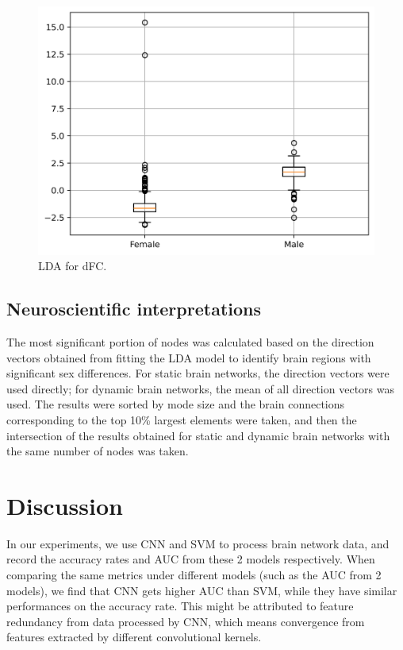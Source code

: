 \documentclass[11pt]{article}
\begin{document}
\begin{figure}[H]
{\begin{minipage}[b]{0.3\textwidth}
            \includegraphics[width=1\textwidth]{../Analysis/LDA/node=50_size=480_step=180_rho=0.1/box.jpg}
        \end{minipage}
    }
    \caption{LDA for dFC.}
\end{figure}

\subsection{Neuroscientiﬁc interpretations}

The most significant portion of nodes was calculated based on the direction vectors obtained from fitting the LDA model to identify brain regions with significant sex differences. For static brain networks, the direction vectors were used directly; for dynamic brain networks, the mean of all direction vectors was used. The results were sorted by mode size and the brain connections corresponding to the top 10\% largest elements were taken, and then the intersection of the results obtained for static and dynamic brain networks with the same number of nodes was taken.

\section{Discussion}

In our experiments, we use CNN and SVM to process brain network data, and record the accuracy rates and AUC from these 2 models respectively. When comparing the same metrics under different models (such as the AUC from 2 models), we find that CNN gets higher AUC than SVM, while they have similar performances on the accuracy rate. This might be attributed to feature redundancy from data processed by CNN, which means convergence from features extracted by different convolutional kernels.
\end{document}
